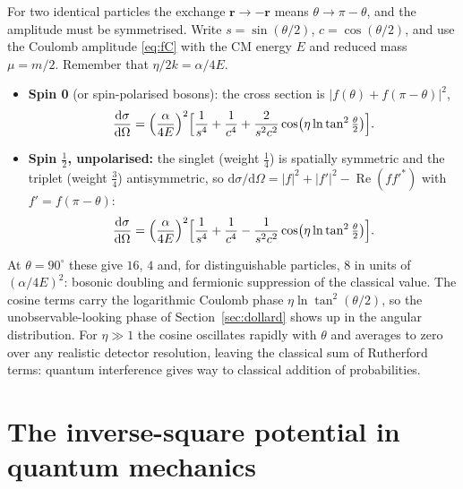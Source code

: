 \documentclass[11pt,a4paper]{book}
\numberwithin{equation}{chapter}
\newcommand{\dd}{\mathrm{d}}
\newcommand{\vr}{\bm{r}}
\newcommand{\Real}{\operatorname{Re}}
\newcommand{\dsdO}{\frac{\dd\sigma}{\dd\Omega}}
\begin{document}
For two identical particles the exchange $\vr\to-\vr$ means
$\theta\to\pi-\theta$, and the amplitude must be symmetrised. Write
$s=\sin(\theta/2)$, $c=\cos(\theta/2)$, and use the Coulomb amplitude
\eqref{eq:fC} with the CM energy $E$ and reduced mass $\mu=m/2$. Remember that
$\eta/2k=\alpha/4E$.
\begin{itemize}
  \item \textbf{Spin 0} (or spin-polarised bosons): the cross section is
        $|f(\theta)+f(\pi-\theta)|^2$,
        \begin{equation}\label{eq:mott0}
          \dsdO=\Bigl(\frac{\alpha}{4E}\Bigr)^{2}\Bigl[\frac1{s^4}+\frac1{c^4}
          +\frac{2}{s^2c^2}\cos\bigl(\eta\ln\tan^2\tfrac\theta2\bigr)\Bigr].
        \end{equation}
  \item \textbf{Spin $\tfrac12$, unpolarised:} the singlet (weight $\tfrac14$) is
        spatially symmetric and the triplet (weight $\tfrac34$) antisymmetric, so
        $\dd\sigma/\dd\Omega=|f|^2+|f'|^2-\Real(ff'^*)$ with
        $f'=f(\pi-\theta)$:
        \begin{equation}\label{eq:mott12}
          \dsdO=\Bigl(\frac{\alpha}{4E}\Bigr)^{2}\Bigl[\frac1{s^4}+\frac1{c^4}
          -\frac{1}{s^2c^2}\cos\bigl(\eta\ln\tan^2\tfrac\theta2\bigr)\Bigr].
        \end{equation}
\end{itemize}
At $\theta=90^\circ$ these give $16$, $4$ and, for distinguishable particles,
$8$ in units of $(\alpha/4E)^2$: bosonic doubling and fermionic suppression of
the classical value. The cosine terms carry the logarithmic Coulomb phase
$\eta\ln\tan^2(\theta/2)$, so the unobservable-looking phase of
Section~\ref{sec:dollard} shows up in the angular distribution. For $\eta\gg1$
the cosine oscillates rapidly with $\theta$ and averages to zero over any
realistic detector resolution, leaving the classical sum of Rutherford terms:
quantum interference gives way to classical addition of probabilities.

\section{The inverse-square potential in quantum mechanics}\label{sec:qinv2}
\end{document}
